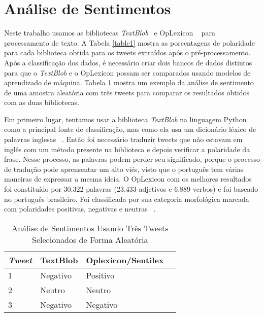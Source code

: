 \section{Análise de Sentimentos}

Neste trabalho usamos as bibliotecas \textit{TextBlob} ~\cite{textblob}e OpLexicon
~\cite{souza} para processamento de texto. A Tabela \ref{table1} mostra as
porcentagens de polaridade para cada biblioteca obtida para
os tweets extraídos após o pré-processamento.
Após a classificação dos dados, é necessário criar dois
bancos de dados distintos para que o \textit{TextBlob} e o OpLexicon
possam ser comparados usando modelos de aprendizado de
máquina. Tabela \ref{table2} mostra um exemplo da análise de sentimento
de uma amostra aleatória com três tweets para comparar
os resultados obtidos com as duas bibliotecas.


Em primeiro lugar, tentamos usar a biblioteca \textit{TextBlob} na
linguagem Python como a principal fonte de classificação,
mas como ela usa um dicionário léxico de palavras inglesas
~\cite{miller1995wordnet}. Então foi necessário traduzir tweets que não estavam em
inglês com um método presente na biblioteca e depois verificar
a polaridade da frase. Nesse processo, as palavras podem
perder seu significado, porque o processo de tradução pode
aprensentar um alto viés, visto que o português tem várias maneiras de expressar a mesma ideia.
O OpLexicon com os melhores resultados foi constituído
por 30.322 palavras (23.433 adjetivos e 6.889 verbos) e foi
baseado no português brasileiro. Foi classificada por sua
categoria morfológica marcada com polaridades positivas,
negativas e neutras ~\cite{souza2011construction}.


    \begin{table}
        \centering
        \caption{Análise de Sentimentos Usando Três Tweets Selecionados de Forma Aleatória}
        \label{table2}
        \begin{tabular}{llll}
        \hline
        \textit{Tweet}          & TextBlob & Oplexicon/Sentilex \\ \hline
        1  & Negativo & Positivo  \\ \hline
        2& Neutro  & Neutro  \\ \hline
        3& Negativo  & Negativo  \\ \hline
        \end{tabular}
        \end{table}




